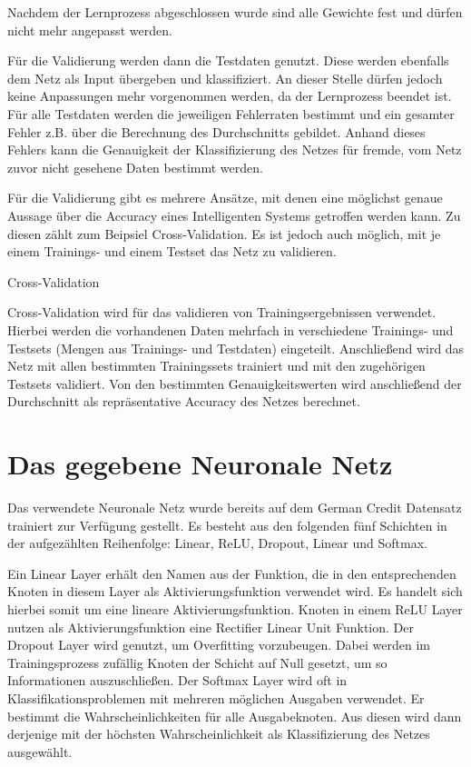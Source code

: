 Nachdem der Lernprozess abgeschlossen wurde sind alle Gewichte fest und dürfen nicht mehr angepasst werden.
\cite{Goodfellow-et-al-2016}  

Für die Validierung werden dann die Testdaten genutzt. Diese werden ebenfalls dem Netz als Input übergeben und klassifiziert. An dieser Stelle dürfen jedoch keine Anpassungen mehr vorgenommen werden, da der Lernprozess beendet ist. Für alle Testdaten werden die jeweiligen Fehlerraten bestimmt und ein gesamter Fehler z.B. über die Berechnung des Durchschnitts gebildet. Anhand dieses Fehlers kann die Genauigkeit der Klassifizierung des Netzes für fremde, vom Netz zuvor nicht gesehene Daten bestimmt werden.  

Für die Validierung gibt es mehrere Ansätze, mit denen eine möglichst genaue Aussage über die Accuracy eines Intelligenten Systems getroffen werden kann. Zu diesen zählt zum Beipsiel Cross-Validation. Es ist jedoch auch möglich, mit je einem Trainings- und einem Testset das Netz zu validieren. 

\begin{definition}
	\label{def: CrossValidation}
	Cross-Validation
	
	Cross-Validation wird für das validieren von Trainingsergebnissen verwendet. Hierbei werden die vorhandenen Daten mehrfach in verschiedene Trainings- und Testsets (Mengen aus Trainings- und Testdaten) eingeteilt. Anschließend wird das Netz mit allen bestimmten Trainingssets trainiert und mit den zugehörigen Testsets validiert. Von den bestimmten Genauigkeitswerten wird anschließend der Durchschnitt als repräsentative Accuracy des Netzes berechnet. \cite{Basics-Training-Daten-ehler-CrossValidation}
\end{definition}

\section{Das gegebene Neuronale Netz}
\label{section: mein NN}
Das verwendete Neuronale Netz wurde bereits auf dem German Credit Datensatz trainiert zur Verfügung gestellt. Es besteht aus den folgenden fünf Schichten in der aufgezählten Reihenfolge: Linear, ReLU, Dropout, Linear und Softmax. 


Ein Linear Layer erhält den Namen aus der Funktion, die in den entsprechenden Knoten in diesem Layer als Aktivierungsfunktion verwendet wird. Es handelt sich hierbei somit um eine lineare Aktivierungsfunktion. \cite{Basics-Linear}
Knoten in einem ReLU Layer nutzen als Aktivierungsfunktion eine Rectifier Linear Unit Funktion. \cite{Basics-ReLU}
Der Dropout Layer wird genutzt, um Overfitting vorzubeugen. Dabei werden im Trainingsprozess zufällig Knoten der Schicht auf Null gesetzt, um so Informationen auszuschließen. \cite{Basics-Dropout}
Der Softmax Layer wird oft in Klassifikationsproblemen mit mehreren möglichen Ausgaben verwendet. Er bestimmt die Wahrscheinlichkeiten für alle Ausgabeknoten. Aus diesen wird dann derjenige mit der höchsten Wahrscheinlichkeit als Klassifizierung des Netzes ausgewählt. \cite{Basics-Softmax, Basics-Softmax-Hardware, Basics-Softmax-Hardware2}


